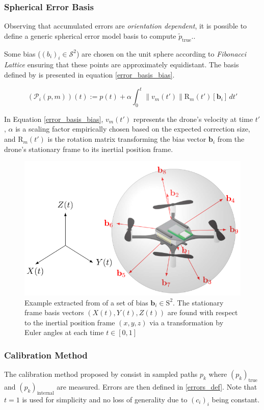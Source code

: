 \documentclass[10pt,journal,compsoc]{IEEEtran}
\begin{document}
\subsubsection{Spherical Error Basis}
Observing that accumulated errors are \emph{orientation dependent}, it is possible to define a generic spherical error model basis to compute $\tilde{p}_{\text{true}}$.\cite{studied}.

Some bias ($(b_i)_i \in \mathcal{S}^2$) are chosen on the unit sphere according to \emph{Fibonacci Lattice} \cite{Hardin2016} ensuring that these points are approximately equidistant. The basis defined by \cite{studied} is presented in equation \eqref{error_basis_bias}.

\begin{equation}\label{error_basis_bias}
    (\mathcal{P}_i (p,m))(t) := p(t) + \alpha \int_{0}^{t} \left\|v_m(t') \right\| \mathrm{R}_m (t') [\mathbf{b}_i] \, dt'
\end{equation}

In Equation \eqref{error_basis_bias}, $v_m(t')$ represents the drone's velocity at time $t'$, $\alpha$ is a scaling factor empirically chosen based on the expected correction size, and $\mathrm{R}_m(t')$ is the rotation matrix transforming the bias vector $\mathbf{b}_i$ from the drone's stationary frame to its inertial position frame.

\begin{figure}
    \centering
    \includegraphics[width=0.7\linewidth]{rsc/bias.png}
    \caption{Example extracted from \cite{studied} of a set of bias $\mathbf{b}_i \in \mathrm{S}^2$. The stationary frame basis vectors $(X (t), Y (t), Z (t))$ are found with respect to the inertial position frame $(x, y, z)$ via a transformation by Euler angles at each time $t \in [0, 1]$}
    \label{fig:enter-label}
\end{figure}

\subsubsection{Calibration Method}
The calibration method proposed by \cite{studied} consist in sampled paths $p_k$ where $(p_k)_{\text{true}}$ and $(p_k)_\text{internal}$ are measured. Errors are then defined in \eqref{errors_def}. Note that $t=1$ is used for simplicity and no loss of generality due to $(c_i)_i$ being constant.
\end{document}

